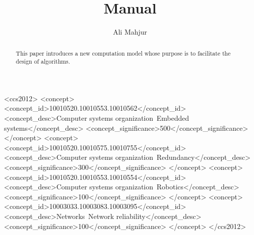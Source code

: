 \documentclass[acmsmall]{acmart}
\begin{document}
\title{Manual}

\author{Ali Mahjur}


\renewcommand{\shortauthors}{Ali Mahjur}

\begin{abstract}
  This paper introduces a new computation model whose purpose is to facilitate the design of algorithms.
\end{abstract}

\begin{CCSXML}
<ccs2012>
 <concept>
  <concept_id>10010520.10010553.10010562</concept_id>
  <concept_desc>Computer systems organization~Embedded systems</concept_desc>
  <concept_significance>500</concept_significance>
 </concept>
 <concept>
  <concept_id>10010520.10010575.10010755</concept_id>
  <concept_desc>Computer systems organization~Redundancy</concept_desc>
  <concept_significance>300</concept_significance>
 </concept>
 <concept>
  <concept_id>10010520.10010553.10010554</concept_id>
  <concept_desc>Computer systems organization~Robotics</concept_desc>
  <concept_significance>100</concept_significance>
 </concept>
 <concept>
  <concept_id>10003033.10003083.10003095</concept_id>
  <concept_desc>Networks~Network reliability</concept_desc>
  <concept_significance>100</concept_significance>
 </concept>
</ccs2012>
\end{CCSXML}

\end{document}
